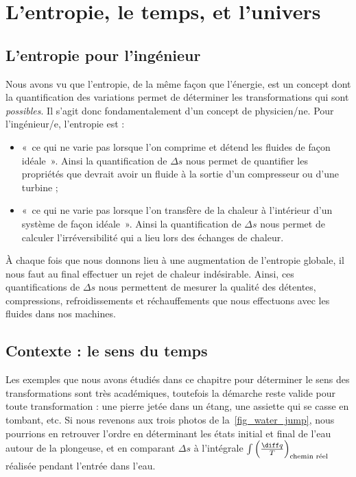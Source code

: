 \section{L’entropie, le temps, et l’univers}

	\subsection{L’entropie pour l’ingénieur}

		Nous avons vu que l’entropie, de la même façon que l’énergie, est un concept dont la quantification des variations permet de déterminer les transformations qui sont \emph{possibles}. Il s’agit donc fondamentalement d’un concept de physicien/ne. Pour l’ingénieur/e, l’entropie est :
		\begin{itemize}
			\item «~ce qui ne varie pas lorsque l’on comprime et détend les fluides de façon idéale~». Ainsi la quantification de $\Delta s$ nous permet de quantifier les propriétés que devrait avoir un fluide à la sortie d’un compresseur ou d’une turbine ;
			\item «~ce qui ne varie pas lorsque l’on transfère de la chaleur à l’intérieur d’un système de façon idéale~». Ainsi la quantification de $\Delta s$ nous permet de calculer l’irréversibilité qui a lieu lors des échanges de chaleur.
		\end{itemize}

	À chaque fois que nous donnons lieu à une augmentation de l’entropie globale, il nous faut au final effectuer un rejet de chaleur indésirable. Ainsi, ces quantifications de $\Delta s$ nous permettent de mesurer la qualité des détentes, compressions, refroidissements et réchauffements que nous effectuons avec les fluides dans nos machines.

	\subsection{Contexte : le sens du temps}
				
		Les exemples que nous avons étudiés dans ce chapitre pour déterminer le sens des transformations sont très académiques, toutefois la démarche reste valide pour toute transformation : une pierre jetée dans un étang, une assiette qui se casse en tombant, etc. Si nous revenons aux trois photos de la~\cref{fig_water_jump}, nous pourrions en retrouver l’ordre en déterminant les états initial et final de l’eau autour de la plongeuse, et en comparant $\Delta s$ à l’intégrale $\int \left(\frac{\diff q}{T}\right)_\text{chemin réel}$ réalisée pendant l’entrée dans l’eau. 
		
